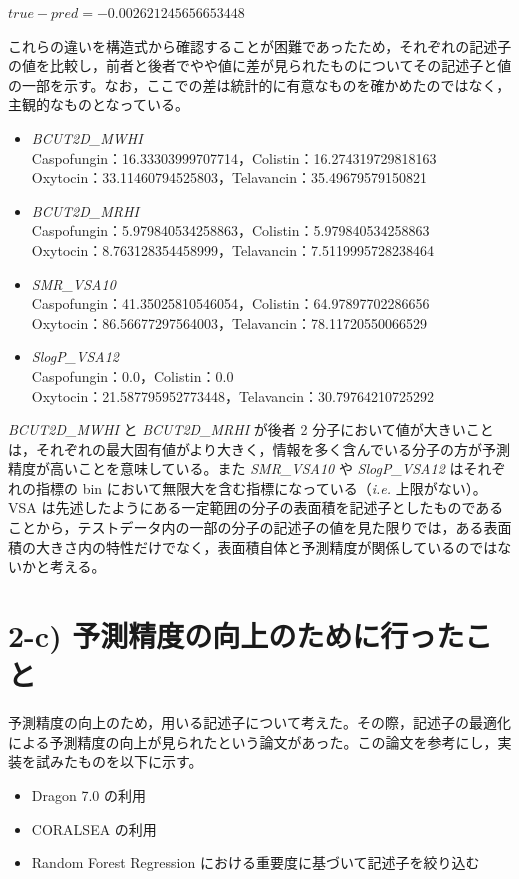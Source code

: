 \documentclass[a4j,11pt]{jarticle}
\begin{document}
$ true - pred = -0.002621245656653448$\par

これらの違いを構造式から確認することが困難であったため，それぞれの記述子の値を比較し，前者と後者でやや値に差が見られたものについてその記述子と値の一部を示す。なお，ここでの差は統計的に有意なものを確かめたのではなく，主観的なものとなっている。
\begin{itemize}
\item  \textit{BCUT2D\_MWHI}\\
Caspofungin：16.33303999707714，Colistin：16.274319729818163\\
Oxytocin：33.11460794525803，Telavancin：35.49679579150821\\
\item  \textit{BCUT2D\_MRHI}\\
Caspofungin：5.979840534258863，Colistin：5.979840534258863\\
Oxytocin：8.763128354458999，Telavancin：7.5119995728238464\\
\item  \textit{SMR\_VSA10}\\
Caspofungin：41.35025810546054，Colistin：64.97897702286656\\
Oxytocin：86.56677297564003，Telavancin：78.11720550066529\\
\item  \textit{SlogP\_VSA12}\\
Caspofungin：0.0，Colistin：0.0\\
Oxytocin：21.587795952773448，Telavancin：30.79764210725292\\
\end{itemize}

\par\textit{BCUT2D\_MWHI} と \textit{BCUT2D\_MRHI} が後者 2 分子において値が大きいことは，それぞれの最大固有値がより大きく，情報を多く含んでいる分子の方が予測精度が高いことを意味している。また \textit{SMR\_VSA10} や  \textit{SlogP\_VSA12} はそれぞれの指標の bin において無限大を含む指標になっている（\textit{i.e.} 上限がない）。VSA は先述したようにある一定範囲の分子の表面積を記述子としたものであることから，テストデータ内の一部の分子の記述子の値を見た限りでは，ある表面積の大きさ内の特性だけでなく，表面積自体と予測精度が関係しているのではないかと考える。\\

\section{2-c) 予測精度の向上のために行ったこと}
予測精度の向上のため，用いる記述子について考えた。その際，記述子の最適化による予測精度の向上が見られたという論文があった。\cite{qsar}この論文を参考にし，実装を試みたものを以下に示す。
\begin{itemize}
\item  Dragon 7.0 \cite{dragon}の利用\\
\item  CORALSEA \cite{coral}の利用\\
\item  Random Forest Regression における重要度に基づいて記述子を絞り込む\\
\end{itemize}
\end{document}
